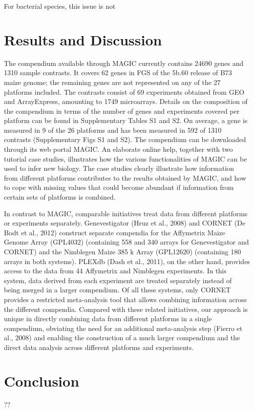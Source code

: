 For bacterial species, this issue is not 




\section{Results and Discussion}

The compendium available through MAGIC currently contains
24690 genes and 1310 sample contrasts. It covers 62%
genes in FGS of the 5b.60 release of B73 maize genome; the
remaining genes are not represented on any of the 27 platforms
included. The contrasts consist of 69 experiments obtained from
GEO and ArrayExpress, amounting to 1749 microarrays. Details
on the composition of the compendium in terms of the number
of genes and experiments covered per platform can be found in
Supplementary Tables S1 and S2. On average, a gene is measured 
in 9 of the 26 platforms and has been measured in 592 of
1310 contrasts (Supplementary Figs S1 and S2). The compendium 
can be downloaded through its web portal MAGIC. An
elaborate online help, together with two tutorial case studies,
illustrates how the various functionalities of MAGIC can be
used to infer new biology. The case studies clearly illustrate
how information from different platforms contributes to the results 
obtained by MAGIC, and how to cope with missing values
that could become abundant if information from certain sets of
platforms is combined.

In contrast to MAGIC, comparable initiatives treat data from
different platforms or experiments separately. Genevestigator
(Hruz et al., 2008) and CORNET (De Bodt et al., 2012) construct 
separate compendia for the Affymetrix Maize Genome
Array (GPL4032) (containing 558 and 340 arrays for
Genevestigator and CORNET) and the Nimblegen Maize
385 k Array (GPL12620) (containing 180 arrays in both systems).
PLEXdb (Dash et al., 2011), on the other hand, provides access
to the data from 44 Affymetrix and Nimblegen experiments. In
this system, data derived from each experiment are treated separately 
instead of being merged in a larger compendium. Of all
these systems, only CORNET provides a restricted meta-analysis
tool that allows combining information across the different compendia.
Compared with these related initiatives, our approach is
unique in directly combining data from different platforms in a
single compendium, obviating the need for an additional meta-analysis 
step (Fierro et al., 2008) and enabling the construction
of a much larger compendium and the direct data analysis across
different platforms and experiments.


\section{Conclusion}

??


\cleardoublepage


